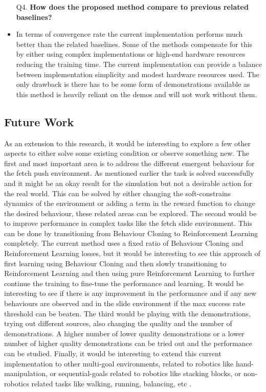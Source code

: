 \begin{itemize}[leftmargin=0.7in]
    \item[Q4.  ] \textbf{How does the proposed method compare to previous related baselines?} \\
    
    \item In terms of convergence rate the current implementation performs much better than the related baselines. Some of the methods compensate for this by either using complex implementations or high-end hardware resources reducing the training time. The current implementation can provide a balance between implementation simplicity and modest hardware resources used. The only drawback is there has to be some form of demonstrations available as this method is heavily reliant on the demos and will not work without them. \\
\end{itemize}

\subsection{Future Work}

As an extension to this research, it would be interesting to explore a few other aspects to either solve some existing condition or observe something new. The first and most important area is to address the different emergent behaviour for the fetch push environment. As mentioned earlier the task is solved successfully and it might be an okay result for the simulation but not a desirable action for the real world. This can be solved by either changing the soft-constrains dynamics of the environment or adding a term in the reward function to change the desired behaviour, these related areas can be explored. The second would be to improve performance in complex tasks like the fetch slide environment. This can be done by transitioning from Behaviour Cloning to Reinforcement Learning completely. The current method uses a fixed ratio of Behaviour Cloning and Reinforcement Learning losses, but it would be interesting to see this approach of first learning using Behaviour Cloning and then slowly transitioning to Reinforcement Learning and then using pure Reinforcement Learning to further continue the training to fine-tune the performance and learning. It would be interesting to see if there is any improvement in the performance and if any new behaviours are observed and in the slide environment if the max success rate threshold can be beaten. The third would be playing with the demonstrations, trying out different sources, also changing the quality and the number of demonstrations. A higher number of lower quality demonstrations or a lower number of higher quality demonstrations can be tried out and the performance can be studied. Finally, it would be interesting to extend this current implementation to other multi-goal environments, related to robotics like hand-manipulation, or sequential-goals related to robotics like stacking blocks, or non-robotics related tasks like walking, running, balancing, etc \cite{brockman2016openai}. \\
